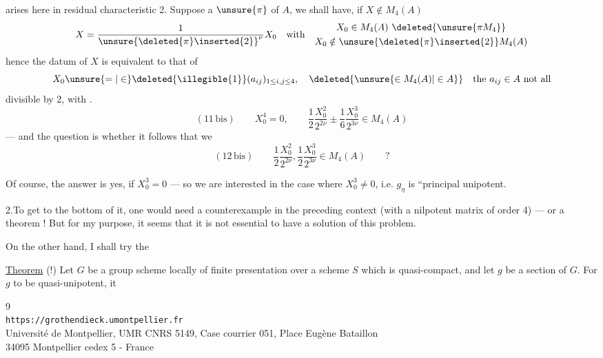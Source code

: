 arises here in residual characteristic 2.  Suppose \deleted{\unsure{$\pi$}}  a  $\unsure{\pi}$ of $A$, we shall have, if $X\notin M_4(A)$
\[
X=\frac{1}{\unsure{\deleted{\pi}\inserted{2}}^{\nu}}X_0
\quad\text{with}\quad
\begin{gathered}
X_0\in M_4(A)\ \deleted{\unsure{\pi M_4}}\\
X_0\notin \unsure{\deleted{\pi}\inserted{2}}M_4(A)
\end{gathered}
\]
hence  the datum of $X$ is equivalent to that of
\[
X_0\unsure{=|\in}\deleted{\illegible{1}}(a_{ij})_{1\leq i,j\leq4},\quad
\deleted{\unsure{\in M_4(A)|\in A}}\quad\text{the }a_{ij}\in A\text{ not all}
\]
divisible by 2, with .
\[
(11\,\text{bis})\qquad X_0^4=0,\qquad
\frac12\frac{X_0^2}{2^{2\nu}}\pm\frac16\frac{X_0^3}{2^{3\nu}}\in M_4(A)
\]
--- and the question is whether it follows that we 
\[
(12\,\text{bis})\qquad
\frac12\frac{X_0^2}{2^{2\nu}},\frac12\frac{X_0^3}{2^{3\nu}}\in M_4(A)\qquad ?
\]

Of course, the  answer is  yes, if $X_0^3=0$  --- so we are interested in the case where $X_0^3\ne0$, i.e.  $g_\eta$ is ``principal unipotent.

2.\quad To get to the bottom of it, one would need a counterexample in the preceding context (with a nilpotent matrix of order 4) --- or a theorem ! But for my purpose, it seems that it is not essential to have a solution of this problem.

On the other hand, I shall try the

\uline{Theorem} (!) Let $G$ be a group scheme  locally of finite presentation over a scheme $S$ which is quasi-compact, and let $g$ be a section of $G$. For $g$ to be quasi-unipotent, it

\begin{center}
\small
9\\
\texttt{https://grothendieck.umontpellier.fr}\\
Université de Montpellier, UMR CNRS 5149, Case courrier 051, Place Eugène Bataillon\\
34095 Montpellier cedex 5 - France
\end{center}

